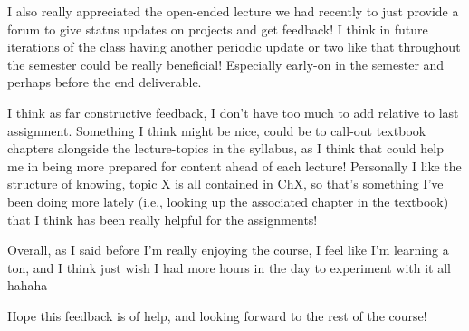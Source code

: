 \documentclass[11pt]{article}
\begin{document}
I also really appreciated the open-ended lecture we had recently to just
provide a forum to give status updates on projects and get feedback! I
think in future iterations of the class having another periodic update
or two like that throughout the semester could be really beneficial!
Especially early-on in the semester and perhaps before the end
deliverable.

I think as far constructive feedback, I don't have too much to add
relative to last assignment. Something I think might be nice, could be
to call-out textbook chapters alongside the lecture-topics in the
syllabus, as I think that could help me in being more prepared for
content ahead of each lecture! Personally I like the structure of
knowing, topic X is all contained in ChX, so that's something I've been
doing more lately (i.e., looking up the associated chapter in the
textbook) that I think has been really helpful for the assignments!

Overall, as I said before I'm really enjoying the course, I feel like
I'm learning a ton, and I think just wish I had more hours in the day to
experiment with it all hahaha

Hope this feedback is of help, and looking forward to the rest of the
course!
    
    
    
\end{document}
